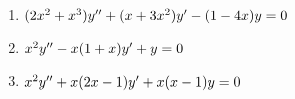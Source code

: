 \begin{enumerate}[resume]
\item $(2 x^{2} + x^{3}) {y}^{\prime \prime} + (x + 3 x^{2}) {y}^{\prime} - (1 - 4 x) y = 0$
\item $x^{2} {y}^{\prime \prime} - x (1 + x) {y}^{\prime} + y = 0$
\item $x^{2} {y}^{\prime \prime} + x (2 x - 1) {y}^{\prime} + x(x - 1) y = 0$
\end{enumerate}

